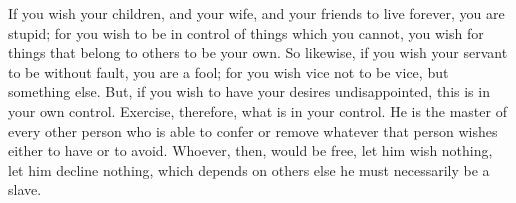 If you wish your children, and your wife, and your friends to
live forever, you are stupid; for you wish to be in control of things
which you cannot, you wish for things that belong to others to be
your own. So likewise, if you wish your servant to be without fault,
you are a fool; for you wish vice not to be vice, but something else.
But, if you wish to have your desires undisappointed, this is in your
own control. Exercise, therefore, what is in your control. He is the
master of every other person who is able to confer or remove whatever
that person wishes either to have or to avoid. Whoever, then, would
be free, let him wish nothing, let him decline nothing, which depends
on others else he must necessarily be a slave. 
